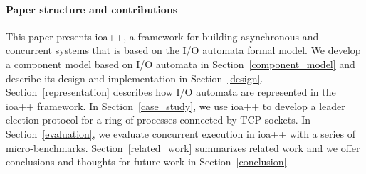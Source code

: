 \paragraph*{Paper structure and contributions}
This paper presents ioa++, a framework for building asynchronous and concurrent systems that is based on the I/O automata formal model.
We develop a component model based on I/O automata in Section~\ref{component_model} and describe its design and implementation in Section~\ref{design}.
Section~\ref{representation} describes how I/O automata are represented in the ioa++ framework.
In Section~\ref{case_study}, we use ioa++ to develop a leader election protocol for a ring of processes connected by TCP sockets.
In Section~\ref{evaluation}, we evaluate concurrent execution in ioa++ with a series of micro-benchmarks.
Section~\ref{related_work} summarizes related work and we offer conclusions and thoughts for future work in Section~\ref{conclusion}.










